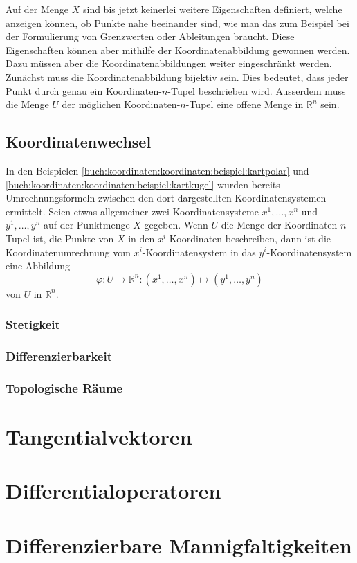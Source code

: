 
Auf der Menge $X$ sind bis jetzt keinerlei weitere Eigenschaften definiert,
welche anzeigen können, ob Punkte nahe beeinander sind, wie man das zum
Beispiel bei der Formulierung von Grenzwerten oder Ableitungen braucht.
Diese Eigenschaften können aber mithilfe der Koordinatenabbildung
gewonnen werden.
Dazu müssen aber die Koordinatenabbildungen weiter eingeschränkt
werden.
Zunächst muss die Koordinatenabbildung bijektiv sein.
Dies bedeutet, dass jeder Punkt durch genau ein Koordinaten-$n$-Tupel
beschrieben wird.
Ausserdem muss die Menge $U$ der möglichen Koordinaten-$n$-Tupel eine
offene Menge in $\mathbb{R}^n$ sein.


\subsection{Koordinatenwechsel}
In den Beispielen
\ref{buch:koordinaten:koordinaten:beispiel:kartpolar}
und
\ref{buch:koordinaten:koordinaten:beispiel:kartkugel}
wurden bereits Umrechnungsformeln zwischen den dort dargestellten
Koordinatensystemen ermittelt.
Seien etwas allgemeiner zwei Koordinatensysteme $x^1,\dots,x^n$
und $y^1,\dots,y^n$ auf der Punktmenge $X$ gegeben.
Wenn $U$ die Menge der Koordinaten-$n$-Tupel ist, die Punkte von $X$
in den $x^i$-Koordinaten beschreiben, dann ist die Koordinatenumrechnung
vom $x^i$-Koordinatensystem in das $y^i$-Koordinatensystem eine Abbildung
\[
\varphi
\colon
U\to\mathbb{R}^n
:
(x^1,\dots,x^n)
\mapsto
(y^1,\dots,y^n)
\]
von $U$ in $\mathbb{R}^n$.


\subsubsection{Stetigkeit}

\subsubsection{Differenzierbarkeit}

\subsubsection{Topologische Räume}

%
%
\section{Tangentialvektoren
\label{buch:koordinaten:section:tangentialvektoren}}

%
%
\section{Differentialoperatoren
\label{buch:koordinaten:section:differentialoperatoren}}

%
%
\section{Differenzierbare Mannigfaltigkeiten
\label{buch:koordinatne:section:mannigfaltigkeiten}}



